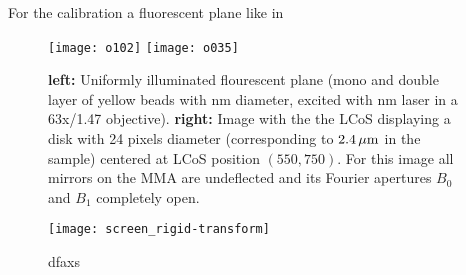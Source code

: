 For the calibration a fluorescent plane like in

\begin{figure}[!hbt]
  \centering
  \texttt{[image: o102]}
  \texttt{[image: o035]}
  \caption{{\bf left:} Uniformly illuminated flourescent plane (mono
    and double layer of yellow beads with \unit[110]{nm} diameter,
    excited with \unit[473]{nm} laser in a 63x/1.47 objective). {\bf
      right:} Image with the the LCoS displaying a disk with 24 pixels
    diameter (corresponding to $\unit[2.4]{\mu m}$ in the sample)
    centered at LCoS position $(550,750)$. For this image all mirrors
    on the MMA are undeflected and its Fourier apertures $B_0$ and
    $B_1$ completely open.}
  \label{fig:rigid-pics}
\end{figure}


\begin{figure}[!hbt]
  \centering
  \texttt{[image: screen\_rigid-transform]}
  \caption{dfaxs}
  \label{fig:screen_rigid-transform}
\end{figure}


